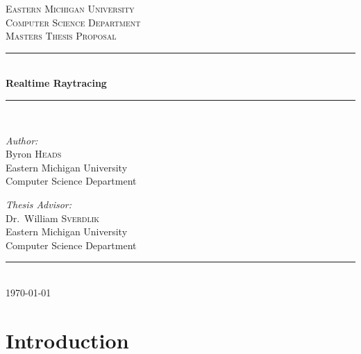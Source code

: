 \documentclass[12pt,a4paper,oneside]{article}
\newcommand{\HRule}{\rule{\linewidth}{0.5mm}}
\begin{document}
\begin{titlepage}
    \begin{center}
        \textsc{\large Eastern Michigan University}\\[1.5cm]
        \textsc{\large Computer Science Department}\\
        \textsc{\large Masters Thesis Proposal}\\[0.5cm]
        \HRule\\[0.4cm]
        { \huge \bfseries  Realtime Raytracing }\\[0.4cm]
        \HRule\\[1.5cm]

        \begin{minipage}{0.45\textwidth}
            \begin{flushleft} \large
                \emph{Author:}\\
                Byron \textsc{Heads} \\
                \small Eastern Michigan University\\
                \small Computer Science Department \\
            \end{flushleft}
        \end{minipage}
        \begin{minipage}{0.45\textwidth}
            \begin{flushright} \large
                \emph{Thesis Advisor:} \\
                Dr.~William \textsc{Sverdlik}\\
                \small Eastern Michigan University\\
                \small Computer Science Department
            \end{flushright}
        \end{minipage}

        \vfill
    
        \HRule\\[0.5cm]
        { \large \today }
    \end{center}
\end{titlepage}

\begin{abstract}

\end{abstract}
\newpage 
\tableofcontents
\newpage 

\section{ Introduction }


\newpage
{}

\end{document}
